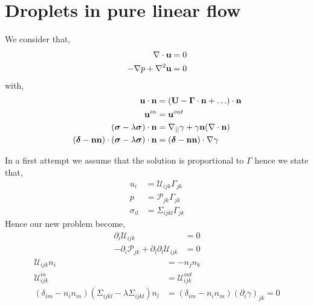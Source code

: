 \documentclass[12pt]{My_preprint}
\begin{document}
\section{Droplets in pure linear flow}
We consider that, 
\begin{align}
    \mathbf{\nabla}\cdot \textbf{u}&= 0\\
    -\mathbf{\nabla} p + \mathbf{\nabla}^2 \textbf{u} &= 0 
\end{align}
with, 
\begin{align}
    \textbf{u}\cdot\textbf{n} &= (\textbf{U} - \bm\Gamma \cdot \textbf{n} +\ldots) \cdot \textbf{n}\\
    \textbf{u}^{in} &=  \textbf{u}^{out}\\
    (\bm\sigma - \lambda\bm\sigma)\cdot\textbf{n} &= \mathbf{\nabla}_{||} \gamma + \gamma \textbf{n} (\mathbf{\nabla}\cdot \textbf{n}) \\
    (\bm\delta - \textbf{nn})\cdot  (\bm\sigma - \lambda\bm\sigma)\cdot\textbf{n} &= (\bm\delta - \textbf{nn}) \cdot \mathbf{\nabla} \gamma
\end{align}

In a first attempt we assume that the solution is proportional to $\Gamma$ hence we state that, 
\begin{align}
    u_i &= \mathcal{U}_{ijk} \Gamma_{jk}  \\
    p &= \mathcal{P}_{jk} \Gamma_{jk}\\
    \sigma_{il} &= \Sigma_{ijkl} \Gamma_{jk}  
\end{align}
Hence our new problem become, 
\begin{align}
    \partial_i \mathcal{U}_{ijk} &= 0\\
    - \partial_i \mathcal{P}_{jk}
    + \partial_l\partial_l \mathcal{U}_{ijk} &= 0
\end{align}
\begin{align}
    \mathcal{U}_{ijk} n_i  &= - n_jn_k \\
    \mathcal{U}_{ijk}^{in} &= \mathcal{U}_{ijk}^{out}\\
    (\delta_{im} - n_in_m) (\Sigma_{ijkl} - \lambda\Sigma_{ijkl})n_l &= (\delta_{im} - n_in_m) (\partial_i \gamma )_{jk}= 0
\end{align}
\end{document}
